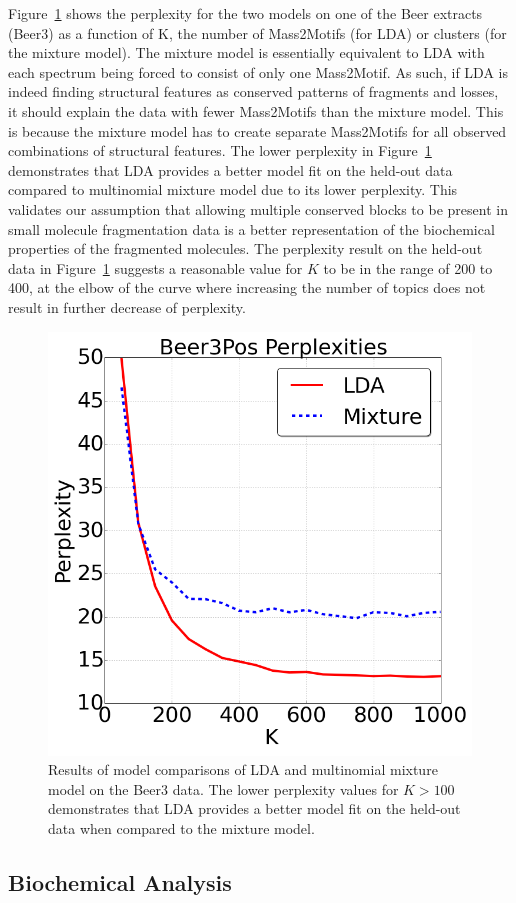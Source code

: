 Figure~\ref{fig:m2lda-perplexity} shows the perplexity for the two models on one of the Beer extracts (Beer3) as a function of K, the number of Mass2Motifs (for LDA) or clusters (for the mixture model). The mixture model is essentially equivalent to LDA with each spectrum being forced to consist of only one Mass2Motif. As such, if LDA is indeed finding structural features as conserved patterns of fragments and losses, it should explain the data with fewer Mass2Motifs than the mixture model. This is because the mixture model has to create separate Mass2Motifs for all observed combinations of structural features. The lower perplexity in Figure~\ref{fig:m2lda-perplexity} demonstrates that LDA provides a better model fit on the held-out data compared to multinomial mixture model due to its lower perplexity. This validates our assumption that allowing multiple conserved blocks to be present in small molecule fragmentation data is a better representation of the biochemical properties of the fragmented molecules. The perplexity result on the held-out data in Figure~\ref{fig:m2lda-perplexity} suggests a reasonable value for $K$ to be in the range of 200 to 400, at the elbow of the curve where increasing the number of topics does not result in further decrease of perplexity. 

\begin{figure}[!htbp]
\centering\includegraphics[width=0.5\linewidth]{07-lda/figures/perplexity.png}
\centering\caption{Results of model comparisons of LDA and multinomial mixture model on the Beer3 data. The lower perplexity values for $K>100$ demonstrates that LDA provides a better model fit on the held-out data when compared to the mixture model.\label{fig:m2lda-perplexity}}
\end{figure}

\subsection{Biochemical Analysis \label{sub:lda-biological-findings}}

